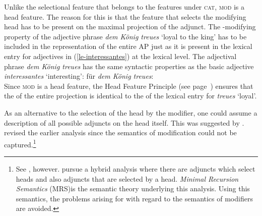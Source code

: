 Unlike the selectional feature \subcat that belongs to the features under \textsc{cat}, \textsc{mod} is a head feature.
The reason for this is that the feature that selects the modifying head has to be present on the maximal projection of the adjunct. The  \nbar{}-modifying property of the adjective
phrase \emph{dem König treues} `loyal to the king' has to be included in the representation of the entire AP just as it is present in the lexical entry for adjectives in (\ref{le-interessantes})
at the lexical level. The adjectival phrase \emph{dem König treues} has the same syntactic
properties as the basic adjective \emph{interessantes} `interesting':
\ea
\label{avm-dem-koenig-treues}
\catv für \emph{dem König treues}:\\
\z
Since \textsc{mod} is a head feature, the Head Feature Principle (see page~\pageref{prinzip-hfp}) ensures that the \modv of the entire projection is identical
to the \modv of the lexical entry for \emph{treues} `loyal'.

As an alternative to the selection of the head by the modifier, one could assume a description of all possible adjuncts on the head itself. This was suggested by
\citet[]{ps}. \citet[Section~1.9]{ps2} revised the earlier analysis since the semantics of
modification could not be captured.\footnote{
		See , however. \citet*{BMS2001a} pursue a hybrid analysis where there are adjuncts which select heads and also adjuncts that are selected
		by a head. \textit{Minimal Recursion Semantics}
        (MRS)\indexmrs is the semantic theory underlying this analysis. Using this semantics, the problems
		arising for \citet*{ps} with regard to the semantics of modifiers are avoided.
}

